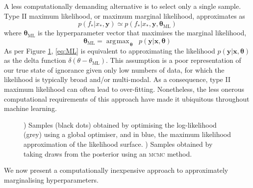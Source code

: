 \documentclass{article}
\newcommand{\vect}[1]{\mathbf{#1}}
\newcommand{\xd}{\vect{x}}
\newcommand{\yd}{\vect{y}}
\DeclareMathOperator*{\argmax}{\arg\!\max\!}
\begin{document}
A less computationally demanding alternative is to select only a single sample. Type II maximum likelihood, or maximum marginal likelihood, approximates as
\begin{equation} \label{eq:ML}
p(f_* |x_*, \yd) \simeq p(f_* | x_*, \yd,\bm{\theta}_{\mathrm{ML}})
\end{equation}
where $\bm{\theta}_{\mathrm{ML}}$ is the hyperparameter vector that maximises the marginal likelihood, 
\begin{equation}
\bm{\theta}_{\mathrm{ML}} = \argmax_{\bm{\theta}} \;\; p(\yd|\xd,\bm{\theta})
\end{equation}
As per Figure \ref{fig:ML}, \eqref{eq:ML} is equivalent to approximating the likelihood $p(\yd|\xd,\bm{\theta})$ as the delta function $\delta(\theta - \theta_{\mathrm{ML}})$. This assumption is a poor representation of our true state of ignorance given only low numbers of data, for which the likelihood is typically broad and/or multi-modal. As a consequence, type II maximum likelihood can often lead to over-fitting. Nonetheless, the less onerous computational requirements of this approach have made it ubiquitous throughout machine learning. 

\begin{figure}
	\begin{subfigure}[b]{7cm}
	  \caption{}
	  \label{fig:ML}
	\end{subfigure}
	\begin{subfigure}[b]{7cm}
	  \caption{}
	  \label{fig:MCMC}
	\end{subfigure}
\caption{) Samples (black dots) obtained by optimising the log-likelihood (grey) using a global optimiser, and in blue, the maximum likelihood approximation of the likelihood surface. ) Samples obtained by taking draws from the posterior using an {\scshape mcmc} method.}
\label{fig:periodic_likelihood}
\end{figure}

We now present a computationally inexpensive approach to approximately marginalising hyperparameters.

\end{document}

